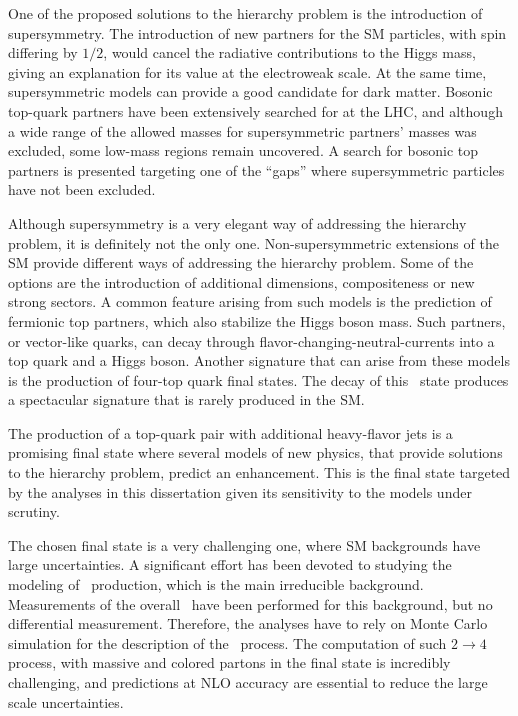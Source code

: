 One of the proposed solutions to the hierarchy problem is the introduction of supersymmetry. The introduction of new partners for the SM particles, with spin differing by $1/2$, would cancel the radiative contributions to the Higgs mass, giving an explanation for its value at the electroweak scale. At the same time, supersymmetric models can provide a good candidate for dark matter. Bosonic top-quark partners have been extensively searched for at the LHC, and although a wide range of the allowed masses for supersymmetric partners' masses was excluded, some low-mass regions remain uncovered. A search for bosonic top partners is presented targeting one of the ``gaps'' where supersymmetric particles have not been excluded. 

Although supersymmetry is a very elegant way of addressing the hierarchy problem, it is definitely not the only one. Non-supersymmetric extensions of the SM provide different ways of addressing the hierarchy problem. Some of the options are the introduction of additional dimensions, compositeness or new strong sectors. A common feature arising from such models is the prediction of fermionic top partners, which also stabilize the Higgs boson mass. Such partners, or vector-like quarks, can decay through flavor-changing-neutral-currents into a top quark and a Higgs boson. 
Another signature that can arise from these models is the production of four-top quark final states. The decay of this \fourtop\ state produces a spectacular signature that is rarely produced in the SM.

The production of a top-quark pair with additional heavy-flavor jets is a promising final state where several models of new physics, that provide solutions to the hierarchy problem, predict an enhancement. This is the final state targeted by the analyses in this dissertation given its sensitivity to the models under scrutiny.

The chosen final state is a very challenging one, where SM backgrounds have large uncertainties. A significant effort has been devoted to studying the modeling of \ttbb\ production, which is the main irreducible background. 
Measurements of the overall \xsec\ have been performed for this background, but no differential measurement. Therefore, the analyses have to rely on Monte Carlo simulation for the description of the \ttbb\ process.
The computation of such $2 \to 4$ process, with massive and colored partons in the final state is incredibly challenging, and predictions at NLO accuracy are essential to reduce the large scale uncertainties.

